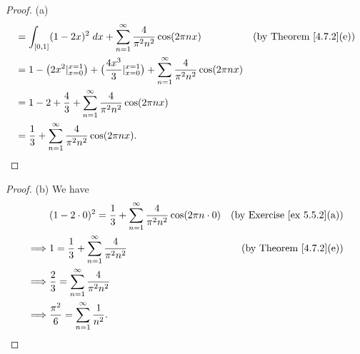 \begin{proof}{(a)}
\begin{align*}
         & = \int_{[0, 1]} (1 - 2x)^2 \; dx + \sum_{n = 1}^\infty \frac{4}{\pi^2 n^2} \cos(2 \pi n x)                                                  & \text{(by Theorem \ref{4.7.2}(e))} \\
         & = 1 - \big(2x^2|_{x = 0}^{x = 1}\big) + \big(\frac{4x^3}{3}|_{x = 0}^{x = 1}\big) + \sum_{n = 1}^\infty \frac{4}{\pi^2 n^2} \cos(2 \pi n x)                                      \\
         & = 1 - 2 + \frac{4}{3} + \sum_{n = 1}^\infty \frac{4}{\pi^2 n^2} \cos(2 \pi n x)                                                                                                  \\
         & = \frac{1}{3} + \sum_{n = 1}^\infty \frac{4}{\pi^2 n^2} \cos(2 \pi n x).
    \end{align*}
\end{proof}

\begin{proof}{(b)}
    We have
    \begin{align*}
                 & (1 - 2 \cdot 0)^2 = \frac{1}{3} + \sum_{n = 1}^\infty \frac{4}{\pi^2 n^2} \cos(2 \pi n \cdot 0) & \text{(by Exercise \ref{ex 5.5.2}(a))} \\
        \implies & 1 = \frac{1}{3} + \sum_{n = 1}^\infty \frac{4}{\pi^2 n^2}                                       & \text{(by Theorem \ref{4.7.2}(e))}     \\
        \implies & \frac{2}{3} = \sum_{n = 1}^\infty \frac{4}{\pi^2 n^2}                                                                                    \\
        \implies & \frac{\pi^2}{6} = \sum_{n = 1}^\infty \frac{1}{n^2}.
    \end{align*}
\end{proof}

